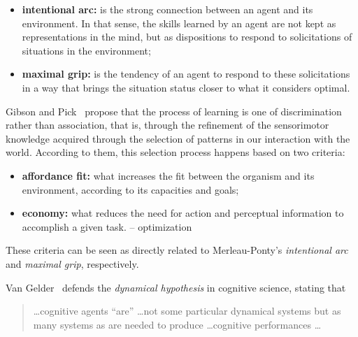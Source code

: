 \documentclass{article}
\begin{document}
\begin{itemize}
\item \textbf{intentional arc:} is the strong connection between an agent and
its environment. In that sense, the skills learned by an agent are not kept as
representations in the mind, but as dispositions to respond to solicitations of
situations in the environment;
\item \textbf{maximal grip:} is the tendency of an agent to respond to these
solicitations in a way that brings the situation status closer to what it
considers optimal.
\end{itemize}

Gibson and Pick~\cite{gibson2000} propose that the process of learning is one of
discrimination rather than association, that is, through the refinement of the
sensorimotor knowledge acquired through the selection of patterns in our
interaction with the world. According to them, this selection process happens
based on two criteria:


\begin{itemize}
\item \textbf{affordance fit:} what increases the fit between the organism and
its environment, according to its capacities and goals;
\item \textbf{economy:} what reduces the need for action and perceptual
information to accomplish a given task. -- optimization
\end{itemize}

These criteria can be seen as directly related to Merleau-Ponty's
\emph{intentional arc} and \emph{maximal grip}, respectively.


Van Gelder~\cite{vangelder1998} defends the \emph{dynamical hypothesis} in
cognitive science, stating that

\begin{quotation}
  \dots cognitive agents ``are'' \dots not some particular dynamical systems but
  as many systems as are needed to produce \dots cognitive performances \dots
\end{quotation}
\end{document}

